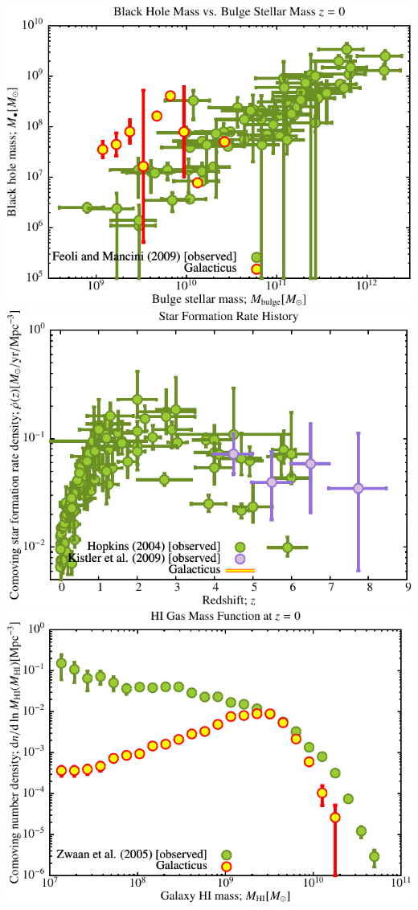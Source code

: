 
\includegraphics[scale=0.6]{r256/h70/stages_12_h_44/Plot_Black_Hole_vs_Bulge_Mass.pdf}
\includegraphics[scale=0.6]{r256/h70/stages_12_h_44/Plot_Star_Formation_History.pdf} \\
\includegraphics[scale=0.6]{r256/h70/stages_12_h_44/Plot_HI_Mass_Function.pdf}

